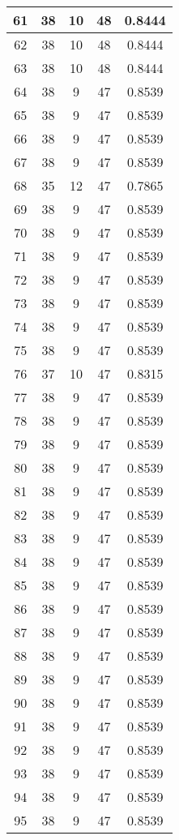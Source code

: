 \documentclass[letterpaper, 12pt]{article}
\begin{document}
\begin{longtable}{|c|c|c|c|c|}
\hline
61 & 38 & 10 & 48 & 0.8444 \\
\hline
62 & 38 & 10 & 48 & 0.8444 \\
\hline
63 & 38 & 10 & 48 & 0.8444 \\
\hline
64 & 38 & 9 & 47 & 0.8539 \\
\hline
65 & 38 & 9 & 47 & 0.8539 \\
\hline
66 & 38 & 9 & 47 & 0.8539 \\
\hline
67 & 38 & 9 & 47 & 0.8539 \\
\hline
68 & 35 & 12 & 47 & 0.7865 \\
\hline
69 & 38 & 9 & 47 & 0.8539 \\
\hline
70 & 38 & 9 & 47 & 0.8539 \\
\hline
71 & 38 & 9 & 47 & 0.8539 \\
\hline
72 & 38 & 9 & 47 & 0.8539 \\
\hline
73 & 38 & 9 & 47 & 0.8539 \\
\hline
74 & 38 & 9 & 47 & 0.8539 \\
\hline
75 & 38 & 9 & 47 & 0.8539 \\
\hline
76 & 37 & 10 & 47 & 0.8315 \\
\hline
77 & 38 & 9 & 47 & 0.8539 \\
\hline
78 & 38 & 9 & 47 & 0.8539 \\
\hline
79 & 38 & 9 & 47 & 0.8539 \\
\hline
80 & 38 & 9 & 47 & 0.8539 \\
\hline
81 & 38 & 9 & 47 & 0.8539 \\
\hline
82 & 38 & 9 & 47 & 0.8539 \\
\hline
83 & 38 & 9 & 47 & 0.8539 \\
\hline
84 & 38 & 9 & 47 & 0.8539 \\
\hline
85 & 38 & 9 & 47 & 0.8539 \\
\hline
86 & 38 & 9 & 47 & 0.8539 \\
\hline
87 & 38 & 9 & 47 & 0.8539 \\
\hline
88 & 38 & 9 & 47 & 0.8539 \\
\hline
89 & 38 & 9 & 47 & 0.8539 \\
\hline
90 & 38 & 9 & 47 & 0.8539 \\
\hline
91 & 38 & 9 & 47 & 0.8539 \\
\hline
92 & 38 & 9 & 47 & 0.8539 \\
\hline
93 & 38 & 9 & 47 & 0.8539 \\
\hline
94 & 38 & 9 & 47 & 0.8539 \\
\hline
95 & 38 & 9 & 47 & 0.8539 \\

\end{longtable}
\end{document}
